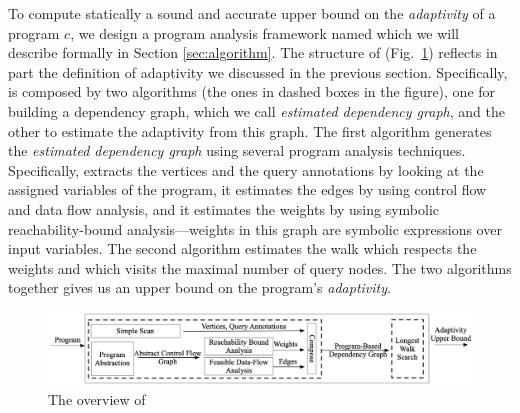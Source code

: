 To compute statically a sound and accurate upper bound on the \emph{adaptivity} of a program $c$,
we design a program analysis framework named {\THESYSTEM} which we will describe formally in Section \ref{sec:algorithm}. 
The structure of {\THESYSTEM} (Fig.~\ref{fig:adaptfun}) reflects in part the definition of adaptivity we discussed in the previous section. Specifically, {\THESYSTEM} is composed by two algorithms (the ones in dashed boxes in the figure), one for building a dependency graph, which we call \emph{estimated dependency graph}, and the other to estimate the adaptivity from this graph.  
The first algorithm generates the \emph{estimated dependency graph} using several program analysis techniques. Specifically,
 {\THESYSTEM} extracts the vertices and the query annotations by looking at the assigned variables of the program, it estimates the edges by using control flow and data flow analysis, and it estimates the weights by using symbolic reachability-bound analysis---weights in this graph are symbolic expressions over input variables. 
The second algorithm estimates the
walk which respects the weights and which visits the maximal number of query nodes.
The two algorithms together gives us an  upper bound on the program's \emph{adaptivity}.

 \begin{figure}
  \centering    
\includegraphics[width=1.0\columnwidth]{adapfun.png}
  \vspace{-0.8cm}
  \caption{The overview of {\THESYSTEM}}
  \label{fig:adaptfun}
  \vspace{-0.5cm}
\end{figure}

